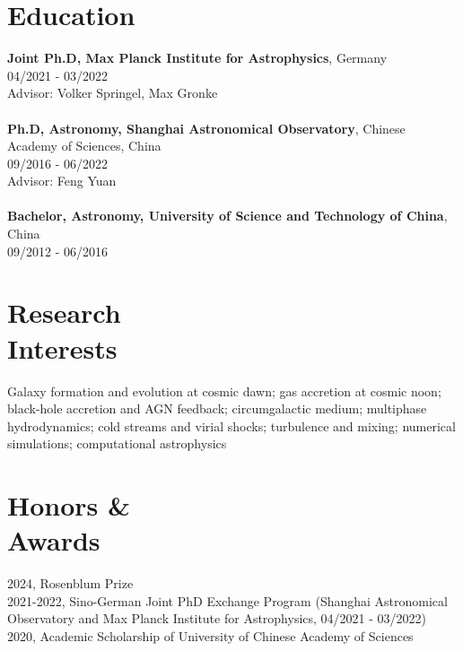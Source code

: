\documentclass[margin, 10pt]{res} %
\begin{document}
\begin{resume}
\section{Education}

\textbf{Joint Ph.D, Max Planck Institute for Astrophysics}, Germany\\
04/2021 - 03/2022\\
Advisor: Volker Springel, Max Gronke\\
\\
\textbf{Ph.D, Astronomy, Shanghai Astronomical Observatory}, Chinese Academy of Sciences, China\\
09/2016 - 06/2022 \\
Advisor: Feng Yuan\\
\\
\textbf{Bachelor, Astronomy, University of Science and Technology of China}, China\\
09/2012 - 06/2016

\section{Research \\ Interests}

Galaxy formation and evolution at cosmic dawn; gas accretion at cosmic noon; black-hole accretion and AGN feedback; circumgalactic medium; multiphase hydrodynamics; cold streams and virial shocks; turbulence and mixing; numerical simulations; computational astrophysics

\section{Honors \& \\ Awards}

2024, Rosenblum Prize\\
2021-2022, Sino-German Joint PhD Exchange Program (Shanghai Astronomical Observatory and Max Planck Institute for Astrophysics, 04/2021 - 03/2022)\\
2020, Academic Scholarship of University of Chinese Academy of Sciences


\end{resume}
\end{document}
